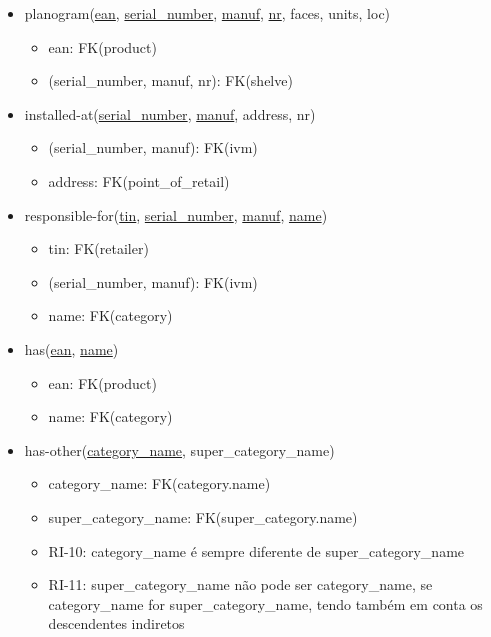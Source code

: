 \documentclass{article}
\newcommand{\bpoint}{\item[$\bullet$]}
\newenvironment{myitemize}
{ \begin{itemize}
	\setlength{\itemsep}{5pt}
	\setlength{\parskip}{0pt}
	\setlength{\parsep}{0pt} }
{ \end{itemize}	}
\begin{document}
\begin{myitemize}
\begin{myitemize}
		\end{myitemize}

		\pagebreak
		\vspace{2mm}

		\item[] planogram(\underline{ean}, \underline{serial\_number}, \underline{manuf}, \underline{nr}, faces, units, loc)
		\begin{myitemize}
			\bpoint ean: FK(product)
			\bpoint (serial\_number, manuf, nr): FK(shelve)
		\end{myitemize}

		\vspace{2mm}

		\item[] installed-at(\underline{serial\_number}, \underline{manuf}, address, nr)
		\begin{myitemize}
			\bpoint (serial\_number, manuf): FK(ivm)
			\bpoint address: FK(point\_of\_retail)
		\end{myitemize}

		\vspace{2mm}

		\item[] responsible-for(\underline{tin}, \underline{serial\_number}, \underline{manuf}, \underline{name})
		\begin{myitemize}
			\bpoint tin: FK(retailer)
			\bpoint (serial\_number, manuf): FK(ivm)
			\bpoint name: FK(category)
		\end{myitemize}

		\vspace{2mm}

		\item[] has(\underline{ean}, \underline{name})
		\begin{myitemize}
			\bpoint ean: FK(product)
			\bpoint name: FK(category)
		\end{myitemize}

		\vspace{2mm}

		\item[] has-other(\underline{category\_name}, super\_category\_name)
		\begin{myitemize}
			\bpoint category\_name: FK(category.name)
			\bpoint super\_category\_name: FK(super\_category.name)
			\bpoint RI-10: category\_name é sempre diferente de super\_category\_name
			\bpoint RI-11: super\_category\_name não pode ser category\_name, se category\_name for super\_category\_name, tendo também em conta os descendentes indiretos

		\end{myitemize}

		\vspace{5mm}


	\end{myitemize}
\end{document}
